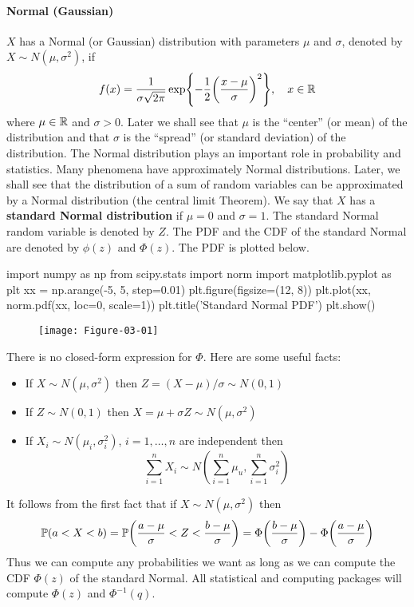 \paragraph{Normal (Gaussian)}\label{normal-gaussian}
\(X\) has a Normal (or Gaussian) distribution with parameters \(\mu\) and \(\sigma\), denoted by \(X \sim N(\mu, \sigma^{2})\), if
\[
f(x) = \frac{1}{\sigma \sqrt{2 \pi}} \exp \left\{ -\frac{1}{2} \left( \frac{x - \mu}{\sigma} \right)^{2}\right\}, \quad x \in \R
\]
where \(\mu \in \mathbb{R}\) and \(\sigma > 0\). Later we shall see that \(\mu\) is the ``center'' (or mean) of the distribution and that \(\sigma\) is the ``spread'' (or standard deviation) of the distribution. The Normal distribution plays an important role in probability and statistics. Many phenomena have approximately Normal distributions. Later, we shall see that the distribution of a sum of random variables can be approximated by a Normal distribution (the central limit Theorem).
We say that \(X\) has a \textbf{standard Normal distribution} if \(\mu = 0\) and \(\sigma = 1\). The standard Normal random variable is denoted by \(Z\). The PDF and the CDF of the standard Normal are denoted by \(\phi(z)\) and \(\Phi(z)\). The PDF is plotted below.

\begin{python}
import numpy as np
from scipy.stats import norm
import matplotlib.pyplot as plt
xx = np.arange(-5, 5, step=0.01)
plt.figure(figsize=(12, 8))
plt.plot(xx, norm.pdf(xx, loc=0, scale=1))
plt.title('Standard Normal PDF')
plt.show()
\end{python}

\begin{figure}[H]
\centering
\texttt{[image: Figure-03-01]}
\end{figure}

There is no closed-form expression for \(\Phi\). Here are some useful facts:
\begin{itemize}
\item
  If \(X \sim N(\mu, \sigma^{2})\) then
  \(Z = (X - \mu) / \sigma \sim N(0, 1)\)
\item
  If \(Z \sim N(0, 1)\) then
  \(X = \mu + \sigma Z \sim N(\mu, \sigma^{2})\)
\item
  If \(X_{i} \sim N(\mu_{i}, \sigma_{i}^{2})\), \(i = 1, \dots, n\) are
  independent then
  \[
\sum_{i=1}^{n} X_{i} \sim N \left(\sum_{i=1}^{n} \mu_u, \sum_{i=1}^{n} \sigma_{i}^{2} \right)
\]
\end{itemize}
It follows from the first fact that if \(X \sim N(\mu, \sigma^{2})\) then
\[
\PROB(a < X < b) 
= \PROB\left( \frac{a - \mu}{\sigma} < Z < \frac{b - \mu}{\sigma} \right) 
= \Phi \left( \frac{b - \mu}{\sigma} \right) - \Phi \left( \frac{a - \mu}{\sigma} \right)
\]
Thus we can compute any probabilities we want as long as we can compute the CDF \(\Phi(z)\) of the standard Normal. All statistical and computing packages will compute \(\Phi(z)\) and \(\Phi^{-1}(q)\).

